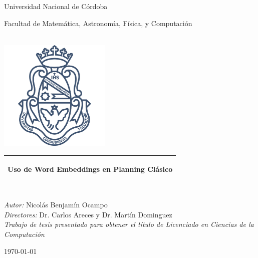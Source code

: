     
\frontmatter

\begin{titlepage}      
    \begin{center}
        {\huge
            Universidad Nacional de Córdoba
            
            \vspace{0.8cm}
            
            Facultad de Matemática, Astronomía, Física, y Computación
        }\\[1cm]
        \includegraphics[width=0.4\textwidth]{./figures/logo_unc.png}
        
        \vspace*{1cm}
        
        \begin{tabular}{@{}p{\textwidth}@{}}
        \toprule[2pt]
        \midrule
        \vspace{0.2cm}
        \begin{center}
        \Huge{\textbf{Uso de Word Embeddings en Planning Clásico}}
        \end{center}
        \vspace{0.2cm}\\
        \midrule
        \toprule[2pt]
        \end{tabular}

        \linespread{1}~\\[1cm]

        {\Large
            \emph{Autor:} Nicolás Benjamín Ocampo
        }\\[1cm]
        {\Large
            \emph{Directores:} Dr. Carlos Areces y Dr. Martín Dominguez
        }\\[1cm]
        
        \vfill
        \Large \emph{Trabajo de tesis presentado para obtener el título de
        Licenciado en Ciencias de la Computación}\\[0.3cm] 
        
        \vspace{0.8cm}
        \vspace{0.8cm}
        
        \today
    \end{center}
\end{titlepage}